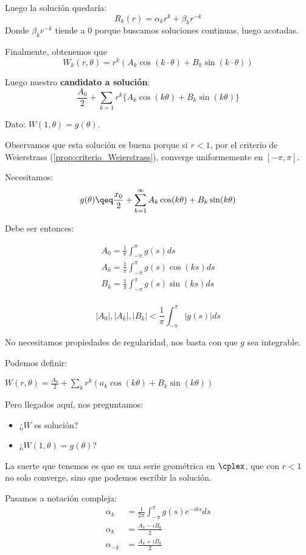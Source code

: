 		Luego la solución quedaría:
		\[ R_k(r) = \alpha_k r^k + \beta_k r^{-k} \]
		Donde $\beta_k r^{-k}$ tiende a 0 porque buscamos soluciones continuas, luego acotadas.

		Finalmente, obtenemos que
		$$W_k(r, \theta) = r^k (A_k \cos(k\cdot \theta) + B_k \sin(k\cdot \theta))$$

		Luego nuestro {\bf candidato a solución}:
		\[\frac{A_0}{2} + \sum_{k=1} r^k \{A_k \cos(k \theta) + B_k \sin(k\theta)\}   \]

		Dato: $W(1,\theta) = g(\theta)$.

		Observamos que esta solución es buena porque si $r<1$, por el criterio de Weierstrass (\ref{prop:criterio_Weierstrass}), converge uniformemente en $[-\pi, \pi]$.

		Necesitamos:
		\[ g(\theta) \qeq \frac{x_0}{2} + \sum_{k = 1}^{\infty} A_k \cos(k \theta) + B_k \sin(k \theta) \]

		Debe ser entonces:

		\[
		\begin{array}{l}
			A_0 = \frac{1}{\pi} \int_{-\pi}^{\pi} g(s) ds \\
			A_k = \frac{1}{\pi} \int_{-\pi}^{\pi} g(s)\cos(ks) ds \\
			B_k = \frac{1}{\pi} \int_{-\pi}^{\pi} g(s) \sin(ks) ds \\
		\end{array}
		\]

		\begin{obs}
			\[ |A_0|, |A_k|, |B_k| < \frac{1}{\pi} \int_{-\pi}^{\pi} |g(s)| ds \]

			No necesitamos propiedades de regularidad, nos basta con que $g$ sea integrable.
		\end{obs}

		Podemos definir:

		\( W(r,\theta) = \frac{A_0}{2} + \sum_k r^k(a_k \cos(k \theta) + B_k \sin(k\theta)) \label{eq:serieW} \)

		Pero llegados aquí, nos preguntamos:

		\begin{itemize}
			\item ¿$W$ es solución?
			\item ¿$W(1, \theta) = g(\theta)$?
		\end{itemize}

		La suerte que tenemos es que es una serie geométrica en $\cplex$, que con $r<1$ no solo converge, sino que podemos escribir la solución.

		Pasamos a notación compleja:
		\begin{align*}
			\alpha_k &= \frac{1}{2\pi} \int_{-\pi}^{\pi} g(s) e^{-iks} ds \\
			\alpha_k &= \frac{A_k - iB_k}{2} \\
			\alpha_{-k} &= \frac{A_k + iB_k}{2}
		\end{align*}

